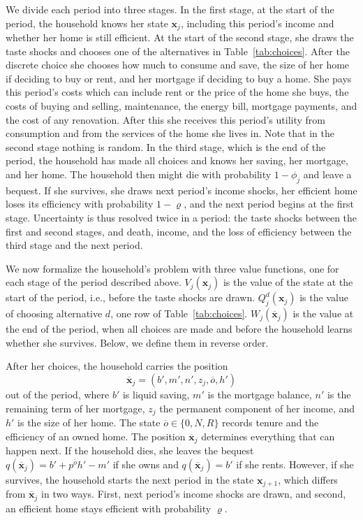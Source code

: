 We divide each period into three stages. In the first stage, at the start
of the period, the household knows her state $\mathbf x_j$, including this
period's income and whether her home is still efficient.  At the start of the second stage, she draws the taste shocks and chooses one of the alternatives in Table~\ref{tab:choices}. After the discrete choice she chooses how much to consume and save, the size of her
home if deciding to buy or rent, and her mortgage if deciding to buy a home. She pays this period's costs which can include rent or the price of the
home she buys, the costs of buying and selling, maintenance, the energy
bill, mortgage payments, and the cost of any renovation. After this she receives this
period's utility from consumption and from the services of the home she lives
in. Note that in the second stage nothing is random. In the third stage, which is the end of the period, the household has made all choices and knows her saving,
her mortgage, and her home. The household then might die with probability
$1-\phi_j$ and leave a bequest. If she survives, she draws next period's
income shocks, her efficient home loses its efficiency with probability
$1-\varrho$, and the next period begins at the first stage. Uncertainty is
thus resolved twice in a period: the taste shocks between the first and second
stages, and death, income, and the loss of efficiency between the third
stage and the next period.

We now formalize the household's problem with three value functions, one for each stage of
the period described above. $V_j(\mathbf x_j)$ is the value of the state at
the start of the period, i.e., before the taste shocks are drawn.
$Q_j^d(\mathbf x_j)$ is the value of choosing alternative $d$, one row of
Table~\ref{tab:choices}. $W_j(\overline{\mathbf x}_j)$ is the value at the
end of the period, when all choices are made and before the household learns
whether she survives. Below, we define them in reverse order.


After her choices, the household carries the position
\begin{equation}
  \overline{\mathbf x}_j=(b',m',n',z_j,\overline o,h')
  \label{eq:end-state}
\end{equation}
out of the period, where $b'$ is liquid saving,  $m'$ is the mortgage balance, $n'$ is the  remaining term  of her mortgage, $z_j$ the permanent component of her income, and $h'$ is the size of her home. The state $\overline o\in\{0,N,R\}$ records tenure and the
efficiency of an owned home. The
position $\overline {\mathbf x}_j$ determines everything that can happen next. If the household
dies, she leaves the bequest $q(\overline{\mathbf x}_j)=b'+p^{\overline o}h'-m'$
if she owns and $q(\overline{\mathbf x}_j)=b'$ if she rents. However, if she survives, the household
starts the next period in the state $\mathbf x_{j+1}$, which differs from
$\overline{\mathbf x}_j$ in  two ways. First, next period's income shocks are drawn, and second, an
efficient home stays efficient with probability $\varrho$.

